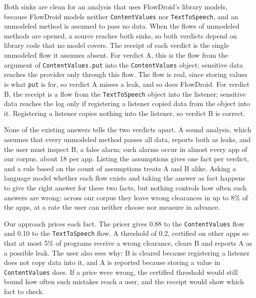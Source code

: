 Both sinks are clean for an analysis that uses FlowDroid's library models, because FlowDroid models neither \texttt{ContentValues} nor \texttt{TextToSpeech}, and an unmodeled method is assumed to pass no data.
When the flows of unmodeled methods are opened, a source reaches both sinks, so both verdicts depend on library code that no model covers.
The receipt of each verdict is the single unmodeled flow it assumes absent.
For verdict A, this is the flow from the argument of \texttt{ContentValues.put} into the \texttt{ContentValues} object; sensitive data reaches the provider only through this flow.
The flow is real, since storing values is what \texttt{put} is for, so verdict A misses a leak, and so does FlowDroid.
For verdict B, the receipt is a flow from the \texttt{TextToSpeech} object into the listener; sensitive data reaches the log only if registering a listener copied data from the object into it.
Registering a listener copies nothing into the listener, so verdict B is correct.

None of the existing answers tells the two verdicts apart.
A sound analysis, which assumes that every unmodeled method passes all data, reports both as leaks, and the user must inspect B, a false alarm; such alarms occur in almost every app of our corpus, about 18 per app.
Listing the assumptions gives one fact per verdict, and a rule based on the count of assumptions treats A and B alike.
Asking a language model whether each flow exists and taking the answer as fact happens to give the right answer for these two facts, but nothing controls how often such answers are wrong: across our corpus they leave wrong clearances in up to 8\% of the apps, at a rate the user can neither choose nor measure in advance.

Our approach prices each fact.
The pricer gives 0.88 to the \texttt{ContentValues} flow and 0.10 to the \texttt{TextToSpeech} flow.
A threshold of 0.2, certified on other apps so that at most 5\% of programs receive a wrong clearance, clears B and reports A as a possible leak.
The user also sees why: B is cleared because registering a listener does not copy data into it, and A is reported because storing a value in \texttt{ContentValues} does.
If a price were wrong, the certified threshold would still bound how often such mistakes reach a user, and the receipt would show which fact to check.

